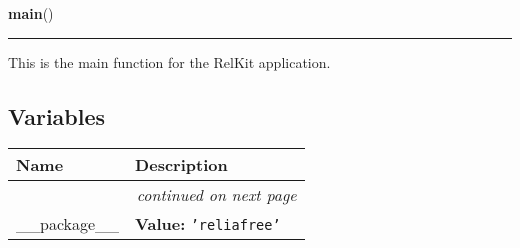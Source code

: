 \hspace{.8\funcindent}\begin{boxedminipage}{\funcwidth}

    \raggedright \textbf{main}()

    \vspace{-1.5ex}

    \rule{\textwidth}{0.5\fboxrule}
\setlength{\parskip}{2ex}
    This is the main function for the RelKit application.

\setlength{\parskip}{1ex}
    \end{boxedminipage}



  \subsection{Variables}

    \vspace{-1cm}
\hspace{\varindent}\begin{longtable}{|p{\varnamewidth}|p{\vardescrwidth}|l}
\cline{1-2}
\cline{1-2} \centering \textbf{Name} & \centering \textbf{Description}& \\
\cline{1-2}
\endhead\cline{1-2}\multicolumn{3}{r}{\small\textit{continued on next page}}\\\endfoot\cline{1-2}
\endlastfoot\raggedright \_\-\_\-p\-a\-c\-k\-a\-g\-e\-\_\-\_\- & \raggedright \textbf{Value:} 
{\tt \texttt{'}\texttt{reliafree}\texttt{'}}&\\
\cline{1-2}
\end{longtable}

